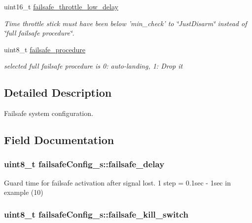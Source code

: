 \begin{DoxyCompactItemize}
uint16\+\_\+t \hyperlink{structfailsafeConfig__s_ab66ba821dd2e8b4fbc1e148c9fe4459d}{failsafe\+\_\+throttle\+\_\+low\+\_\+delay}
\begin{DoxyCompactList}\small\item\em Time throttle stick must have been below 'min\+\_\+check' to \char`\"{}\+Just\+Disarm\char`\"{} instead of \char`\"{}full failsafe procedure\char`\"{}. \end{DoxyCompactList}\item 
uint8\+\_\+t \hyperlink{structfailsafeConfig__s_a306c835be29095a96a2bd376860da270}{failsafe\+\_\+procedure}
\begin{DoxyCompactList}\small\item\em selected full failsafe procedure is 0\+: auto-\/landing, 1\+: Drop it \end{DoxyCompactList}\end{DoxyCompactItemize}


\subsection{Detailed Description}
Failsafe system configuration. 

\subsection{Field Documentation}
\hypertarget{structfailsafeConfig__s_a6a70af0c8e4c935027ed50a204329fa2}{
\subsubsection[{failsafe\+\_\+delay}]{\setlength{\rightskip}{0pt plus 5cm}uint8\+\_\+t failsafe\+Config\+\_\+s\+::failsafe\+\_\+delay}}\label{structfailsafeConfig__s_a6a70af0c8e4c935027ed50a204329fa2}


Guard time for failsafe activation after signal lost. 1 step = 0.\+1sec -\/ 1sec in example (10) 

\hypertarget{structfailsafeConfig__s_a0e65451c6e1389fca9f8d2797da78866}{
\subsubsection[{failsafe\+\_\+kill\+\_\+switch}]{\setlength{\rightskip}{0pt plus 5cm}uint8\+\_\+t failsafe\+Config\+\_\+s\+::failsafe\+\_\+kill\+\_\+switch}}\label{structfailsafeConfig__s_a0e65451c6e1389fca9f8d2797da78866}


